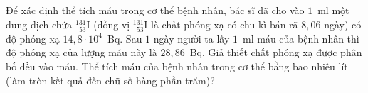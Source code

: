 	\begin{ex}%
		Để xác định thể tích máu trong cơ thể bệnh nhân, bác sĩ đã cho vào $1$~ml một dung dịch chứa $^{131}_{\phantom{1}53}\text{I}$ (đồng vị $^{131}_{\phantom{1}53}\text{I}$ là chất phóng xạ có chu kì bán rã $8{,}06$ ngày) có độ phóng xạ $14{,}8\cdot 10^4$~Bq. Sau $1$ ngày người ta lấy $1$~ml máu của bệnh nhân thì độ phóng xạ của lượng máu này là $28{,}86$~Bq. Giả thiết chất phóng xạ được phân bố đều vào máu. Thể tích máu của bệnh nhân trong cơ thể bằng bao nhiêu lít (làm tròn kết quả đến chữ số hàng phần trăm)?
		\par
	\end{ex}

